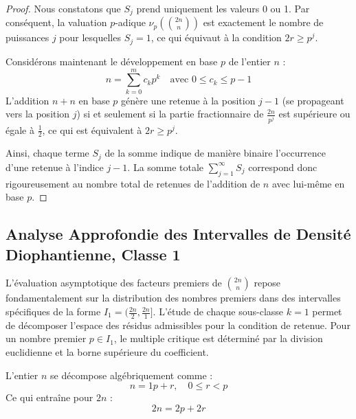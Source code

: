 \documentclass[12pt,a4paper]{article}
\begin{document}
\begin{proof}
Nous constatons que $S_j$ prend uniquement les valeurs 0 ou 1.
Par conséquent, la valuation $p$-adique $\nu_p\left( \binom{2n}{n} \right)$ est exactement le nombre de puissances $j$ pour lesquelles $S_j = 1$, ce qui équivaut à la condition $2r \ge p^j$.

Considérons maintenant le développement en base $p$ de l'entier $n$ :
\begin{equation}
n = \sum_{k=0}^{m} c_k p^k \quad \text{avec } 0 \le c_k \le p-1
\end{equation}
L'addition $n + n$ en base $p$ génère une retenue à la position $j-1$ (se propageant vers la position $j$) si et seulement si la partie fractionnaire de $\frac{2n}{p^j}$ est supérieure ou égale à $\frac{1}{2}$, ce qui est équivalent à $2r \ge p^j$.

Ainsi, chaque terme $S_j$ de la somme indique de manière binaire l'occurrence d'une retenue à l'indice $j-1$.
La somme totale $\sum_{j=1}^{\infty} S_j$ correspond donc rigoureusement au nombre total de retenues de l'addition de $n$ avec lui-même en base $p$.
\end{proof}

    \newpage
    \subsection{Analyse Approfondie des Intervalles de Densité Diophantienne, Classe 1}
    L'évaluation asymptotique des facteurs premiers de $\binom{2n}{n}$ repose fondamentalement sur la distribution des nombres premiers dans des intervalles spécifiques de la forme $I_1 = (\frac{2n}{2}, \frac{2n}{1}]$.
    L'étude de chaque sous-classe $k = 1$ permet de décomposer l'espace des résidus admissibles pour la condition de retenue.
    Pour un nombre premier $p \in I_1$, le multiple critique est déterminé par la division euclidienne et la borne supérieure du coefficient.

    L'entier $n$ se décompose algébriquement comme :
    \begin{equation}
    n = 1 p + r, \quad 0 \le r < p
    \end{equation}
    Ce qui entraîne pour $2n$ :
    \begin{equation}
    2n = 2 p + 2r
    \end{equation}
\end{document}
